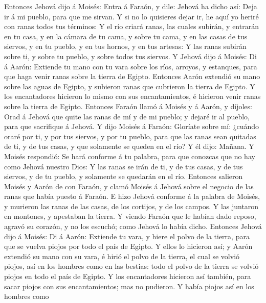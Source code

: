  Entonces Jehová dijo á Moisés: Entra á Faraón, y dile:
Jehová ha dicho así: Deja ir á mi pueblo, para que me sirvan.
 Y si no lo quisieres dejar ir, he aquí yo heriré con
ranas todos tus términos:  Y el río criará ranas, las
cuales subirán, y entrarán en tu casa, y en la cámara de tu cama, y
sobre tu cama, y en las casas de tus siervos, y en tu pueblo, y en tus
hornos, y en tus artesas:  Y las ranas subirán sobre ti, y
sobre tu pueblo, y sobre todos tus siervos.  Y Jehová dijo
á Moisés: Di á Aarón: Extiende tu mano con tu vara sobre los ríos,
arroyos, y estanques, para que haga venir ranas sobre la tierra de
Egipto.  Entonces Aarón extendió su mano sobre las aguas
de Egipto, y subieron ranas que cubrieron la tierra de Egipto.
 Y los encantadores hicieron lo mismo con sus
encantamientos, é hicieron venir ranas sobre la tierra de Egipto.
 Entonces Faraón llamó á Moisés y á Aarón, y díjoles: Orad
á Jehová que quite las ranas de mí y de mi pueblo; y dejaré ir al
pueblo, para que sacrifique á Jehová.  Y dijo Moisés á
Faraón: Gloríate sobre mí: ¿cuándo oraré por ti, y por tus siervos, y
por tu pueblo, para que las ranas sean quitadas de ti, y de tus casas, y
que solamente se queden en el río?  Y él dijo: Mañana. Y
Moisés respondió: Se hará conforme á tu palabra, para que conozcas que
no hay como Jehová nuestro Dios:  Y las ranas se irán de
ti, y de tus casas, y de tus siervos, y de tu pueblo, y solamente se
quedarán en el río.  Entonces salieron Moisés y Aarón de
con Faraón, y clamó Moisés á Jehová sobre el negocio de las ranas que
había puesto á Faraón.  E hizo Jehová conforme á la
palabra de Moisés, y murieron las ranas de las casas, de los cortijos, y
de los campos.  Y las juntaron en montones, y apestaban
la tierra.  Y viendo Faraón que le habían dado reposo,
agravó su corazón, y no los escuchó; como Jehová lo había dicho.
 Entonces Jehová dijo á Moisés: Di á Aarón: Extiende tu
vara, y hiere el polvo de la tierra, para que se vuelva piojos por todo
el país de Egipto.  Y ellos lo hicieron así; y Aarón
extendió su mano con su vara, é hirió el polvo de la tierra, el cual se
volvió piojos, así en los hombres como en las bestias: todo el polvo de
la tierra se volvió piojos en todo el país de Egipto.  Y
los encantadores hicieron así también, para sacar piojos con sus
encantamientos; mas no pudieron. Y había piojos así en los hombres como
